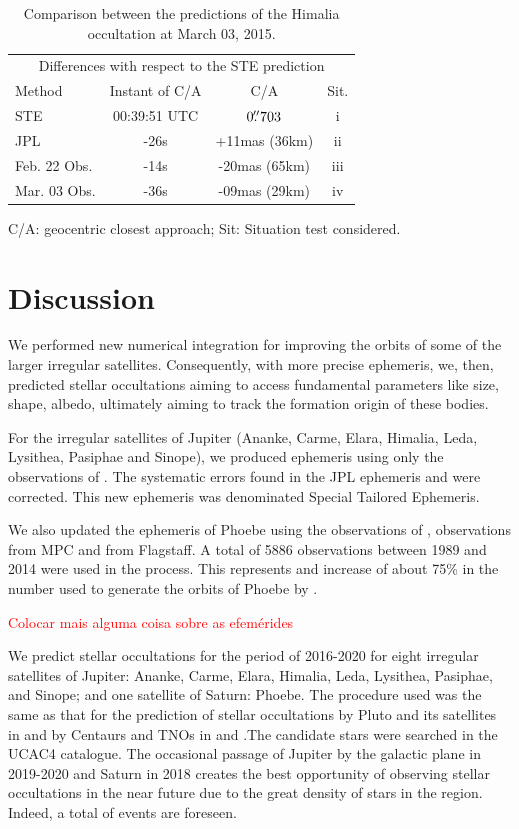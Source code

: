 \documentclass[useAMS,usenatbib]{mn2e}
\begin{document}
\begin{table}
\caption{\label{Tab: comparison-Himalia} Comparison between the predictions of the Himalia occultation at March 03, 2015.}
\begin{centering}
\begin{tabular}{lccc}
\hline  \hline
\multicolumn{4}{c}{Differences with respect to the STE prediction} \tabularnewline
Method  & Instant of C/A  & C/A & Sit.   \tabularnewline
\hline
STE & 00:39:51 UTC & $0\hbox{$.\!\!^{\prime\prime}$}703$ & i \tabularnewline
JPL & -26s & +11mas (36km) & ii \tabularnewline %
Feb. 22 Obs. & -14s & -20mas (65km) & iii \tabularnewline %
Mar. 03 Obs. & -36s & -09mas (29km) & iv \tabularnewline %
\hline
\end{tabular}
\par\end{centering}
C/A: geocentric closest approach; Sit: Situation test considered.
\end{table}

\section{Discussion} \label{Sec: discussion}

We performed new numerical integration for improving the orbits of some of the larger irregular satellites. Consequently, with more precise ephemeris, we, then, predicted stellar occultations aiming to access fundamental parameters like size, shape, albedo, ultimately aiming to track the formation origin of these bodies.

For the irregular satellites of Jupiter (Ananke, Carme, Elara, Himalia, Leda, Lysithea, Pasiphae and Sinope), we produced ephemeris using only the observations of \cite{GomesJunior2015}. The systematic errors found in the JPL ephemeris \citep{Jacobson2012} and \cite{Emelyanov2008} were corrected. This new ephemeris was denominated Special Tailored Ephemeris.

We also updated the ephemeris of Phoebe \citep{Desmars2013} using the observations of \cite{GomesJunior2015}, \cite{Peng2015} observations from  MPC and from Flagstaff. A total of 5886 observations between 1989 and 2014 were used in the process. This represents and increase of about 75\% in the number used to generate the orbits of Phoebe by \cite{Desmars2013}.

\textcolor{red}{Colocar mais alguma coisa sobre as efemérides}

We predict stellar occultations for the period of 2016-2020 for eight irregular satellites of Jupiter: Ananke, Carme, Elara, Himalia, Leda, Lysithea, Pasiphae, and Sinope; and one satellite of Saturn: Phoebe. The procedure used was the same as that for the prediction of stellar occultations by Pluto and its satellites in \cite{Assafin2010} and by Centaurs and TNOs in \cite{Assafin2012} and \cite{Camargo2014}.The candidate stars were searched in the UCAC4 catalogue. The occasional passage of Jupiter by the galactic plane in 2019-2020 and Saturn in 2018 creates the best opportunity of observing stellar occultations in the near future due to the great density of stars in the region. Indeed, a total of \noccs events are foreseen.
\end{document}
